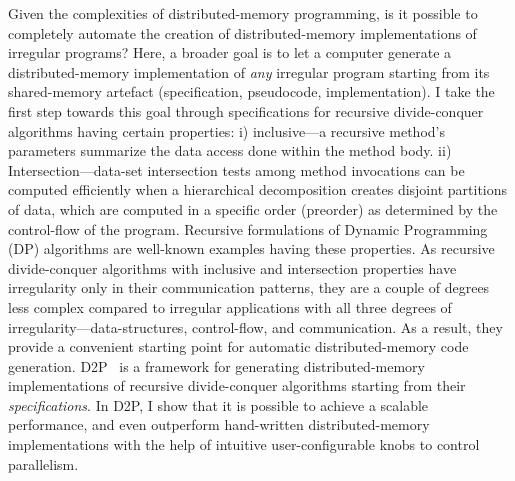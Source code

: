 Given the complexities of distributed-memory programming, is it possible to completely automate the creation of distributed-memory implementations of irregular programs? 
Here, a broader goal is to let a computer generate a distributed-memory implementation of {\em any} irregular program starting from its shared-memory artefact (specification, pseudocode, implementation). 
I take the first step towards this goal through specifications for recursive divide-conquer algorithms having certain properties: i) inclusive---a recursive method's parameters summarize the data access done within the method body.
ii) Intersection---data-set intersection tests among method invocations can be computed efficiently when a hierarchical decomposition creates disjoint partitions of data, which are computed in a specific order (preorder) as determined by the control-flow of the program. 
Recursive formulations of Dynamic Programming (DP) algorithms are well-known examples having these properties. 
As recursive divide-conquer algorithms with inclusive and intersection properties have irregularity only in their communication patterns, they are a couple of degrees less complex compared to irregular applications with all three degrees of irregularity---data-structures, control-flow, and communication. As a result, they provide a convenient starting point for automatic distributed-memory code generation. 
D2P~\cite{hegde19d2p} is a framework for generating distributed-memory implementations of recursive divide-conquer algorithms starting from their {\em specifications}.
In D2P, I show that it is possible to achieve a scalable performance, and even outperform hand-written distributed-memory implementations with the help of intuitive user-configurable knobs to control parallelism.

